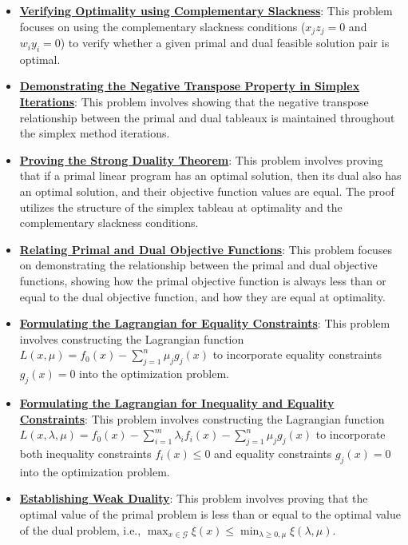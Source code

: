 \documentclass{article}%
\begin{document}
\begin{itemize}[leftmargin=*]%
\item \href{https://www.math.purdue.edu/~yipn/421//2024-09-12-Duality.pdf#page=21}{\textbf{Verifying Optimality using Complementary Slackness}}: This problem focuses on using the complementary slackness conditions ($x_j z_j = 0$ and $w_i y_i = 0$) to verify whether a given primal and dual feasible solution pair is optimal.%
\item \href{https://www.math.purdue.edu/~yipn/421//2024-09-12-Duality.pdf#page=6}{\textbf{Demonstrating the Negative Transpose Property in Simplex Iterations}}: This problem involves showing that the negative transpose relationship between the primal and dual tableaux is maintained throughout the simplex method iterations.%
\item \href{https://www.math.purdue.edu/~yipn/421//2024-09-12-Duality.pdf#page=11}{\textbf{Proving the Strong Duality Theorem}}: This problem involves proving that if a primal linear program has an optimal solution, then its dual also has an optimal solution, and their objective function values are equal.  The proof utilizes the structure of the simplex tableau at optimality and the complementary slackness conditions.%
\item \href{https://www.math.purdue.edu/~yipn/421//2024-09-12-Duality.pdf#page=22}{\textbf{Relating Primal and Dual Objective Functions}}: This problem focuses on demonstrating the relationship between the primal and dual objective functions, showing how the primal objective function is always less than or equal to the dual objective function, and how they are equal at optimality.%
\item \href{https://www.math.purdue.edu/~yipn/421//2024-09-17-DualityGeneral.pdf#page=2}{\textbf{Formulating the Lagrangian for Equality Constraints}}: This problem involves constructing the Lagrangian function $L(x, \mu) = f_0(x) - \sum_{j=1}^n \mu_j g_j(x)$ to incorporate equality constraints $g_j(x) = 0$ into the optimization problem.%
\item \href{https://www.math.purdue.edu/~yipn/421//2024-09-17-DualityGeneral.pdf#page=7}{\textbf{Formulating the Lagrangian for Inequality and Equality Constraints}}: This problem involves constructing the Lagrangian function $L(x, \lambda, \mu) = f_0(x) - \sum_{i=1}^m \lambda_i f_i(x) - \sum_{j=1}^n \mu_j g_j(x)$ to incorporate both inequality constraints $f_i(x) \le 0$ and equality constraints $g_j(x) = 0$ into the optimization problem.%
\item \href{https://www.math.purdue.edu/~yipn/421//2024-09-17-DualityGeneral.pdf#page=5}{\textbf{Establishing Weak Duality}}: This problem involves proving that the optimal value of the primal problem is less than or equal to the optimal value of the dual problem, i.e., $\max_{x \in \mathcal{G}} \xi(x) \le \min_{\lambda \ge 0, \mu} \xi(\lambda, \mu)$.%

\end{itemize}
\end{document}
